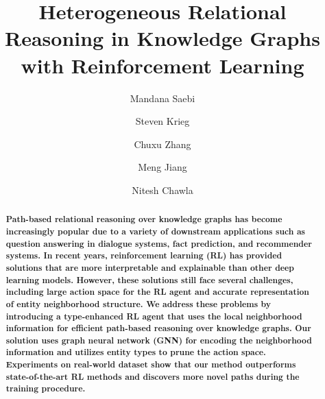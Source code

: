\documentclass[runningheads]{llncs}
\begin{document}
\title{Heterogeneous Relational Reasoning in Knowledge Graphs with Reinforcement Learning}

\author{Mandana Saebi \and
Steven Krieg\and
Chuxu Zhang\and Meng Jiang \and Nitesh Chawla}
%




\maketitle

\newcommand{\ot}{Ours (-T)}
\newcommand{\on}{Ours (-N)}
\newcommand{\otn}{Ours (TN)}

\begin{abstract}
\textbf{Path-based relational reasoning over knowledge graphs has become increasingly popular due to a variety of downstream applications such as question answering in dialogue systems, fact prediction, and recommender systems. In recent years, reinforcement learning (RL) has provided solutions that are more interpretable and explainable than other deep learning models. However, these solutions still face several challenges, including large action space for the RL agent and accurate representation of entity neighborhood structure.  We address these problems by introducing a type-enhanced RL agent that uses the local neighborhood information for efficient path-based reasoning over knowledge graphs. Our solution uses graph neural network (GNN) for encoding the neighborhood information and utilizes entity types to prune the action space. Experiments on real-world dataset show that our method outperforms state-of-the-art RL methods and discovers more novel paths during the training procedure.}
\end{abstract}


\makeatletter
\makeatother




\end{document}
